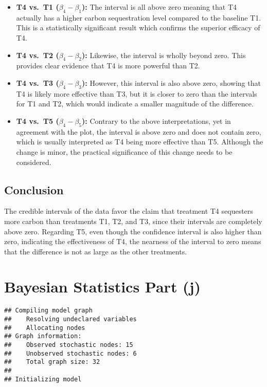 \documentclass[
]{article}
\begin{document}
\begin{itemize}
\item
  \textbf{T4 vs.~T1 (\(\beta_4 - \beta_1\)):} The interval is all above
  zero meaning that T4 actually has a higher carbon sequestration level
  compared to the baseline T1. This is a statistically significant
  result which confirms the superior efficacy of T4.
\item
  \textbf{T4 vs.~T2 (\(\beta_4 - \beta_2\)):} Likewise, the interval is
  wholly beyond zero. This provides clear evidence that T4 is more
  powerful than T2.
\item
  \textbf{T4 vs.~T3 (\(\beta_4 - \beta_3\)):} However, this interval is
  also above zero, showing that T4 is likely more effective than T3, but
  it is closer to zero than the intervals for T1 and T2, which would
  indicate a smaller magnitude of the difference.
\item
  \textbf{T4 vs.~T5 (\(\beta_4 - \beta_5\)):} Contrary to the above
  interpretations, yet in agreement with the plot, the interval is above
  zero and does not contain zero, which is usually interpreted as T4
  being more effective than T5. Although the change is minor, the
  practical significance of this change needs to be considered.
\end{itemize}

\subsection{Conclusion}\label{conclusion-2}

The credible intervals of the data favor the claim that treatment T4
sequesters more carbon than treatments T1, T2, and T3, since their
intervals are completely above zero. Regarding T5, even though the
confidence interval is also higher than zero, indicating the
effectiveness of T4, the nearness of the interval to zero means that the
difference is not as large as the other treatments.

\section{Bayesian Statistics Part (j)}\label{bayesian-statistics-part-j}

\begin{verbatim}
## Compiling model graph
##    Resolving undeclared variables
##    Allocating nodes
## Graph information:
##    Observed stochastic nodes: 15
##    Unobserved stochastic nodes: 6
##    Total graph size: 32
## 
## Initializing model
\end{verbatim}
\end{document}
